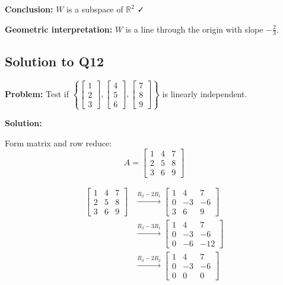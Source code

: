 \documentclass[12pt,a4paper]{article}
\theoremstyle{definition}
\begin{document}
\textbf{Conclusion:} $W$ is a subspace of $\mathbb{R}^2$ ✓

\textbf{Geometric interpretation:} $W$ is a line through the origin with slope $-\frac{2}{3}$.

\subsection{Solution to Q12}

\textbf{Problem:} Test if $\left\{\begin{bmatrix} 1 \\ 2 \\ 3 \end{bmatrix}, \begin{bmatrix} 4 \\ 5 \\ 6 \end{bmatrix}, \begin{bmatrix} 7 \\ 8 \\ 9 \end{bmatrix}\right\}$ is linearly independent.

\textbf{Solution:}

Form matrix and row reduce:
\begin{equation}
A = \begin{bmatrix} 1 & 4 & 7 \\ 2 & 5 & 8 \\ 3 & 6 & 9 \end{bmatrix}
\end{equation}

\begin{align}
\begin{bmatrix} 1 & 4 & 7 \\ 2 & 5 & 8 \\ 3 & 6 & 9 \end{bmatrix} &\xrightarrow{R_2 - 2R_1} \begin{bmatrix} 1 & 4 & 7 \\ 0 & -3 & -6 \\ 3 & 6 & 9 \end{bmatrix} \\
&\xrightarrow{R_3 - 3R_1} \begin{bmatrix} 1 & 4 & 7 \\ 0 & -3 & -6 \\ 0 & -6 & -12 \end{bmatrix} \\
&\xrightarrow{R_3 - 2R_2} \begin{bmatrix} 1 & 4 & 7 \\ 0 & -3 & -6 \\ 0 & 0 & 0 \end{bmatrix}
\end{align}
\end{document}
